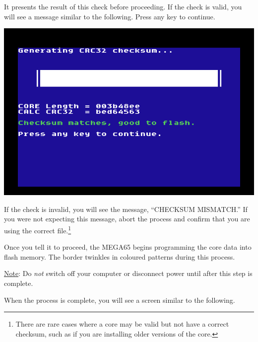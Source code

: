 It presents the result of this check before proceeding. If the check is valid, you will see a message similar to the following. Press any key to continue.

\begin{center}
  \includegraphics[width=0.7\linewidth]{images/ss-flashmenu-3-checksum-ok.png}
\end{center}

If the check is invalid, you will see the message, ``CHECKSUM MISMATCH.'' If you were not expecting this message, abort the process and confirm that you are using the correct file.\footnote{There are rare cases where a core may be valid but not have a correct checksum, such as if you are installing older versions of the core.}

Once you tell it to proceed, the MEGA65 begins programming the core data into flash memory. The border twinkles in coloured patterns during this process.

\underline{Note}: Do {\em not} switch off your computer or disconnect power until after this step is complete.

\begin{center}
\end{center}

When the process is complete, you will see a screen similar to the following.

